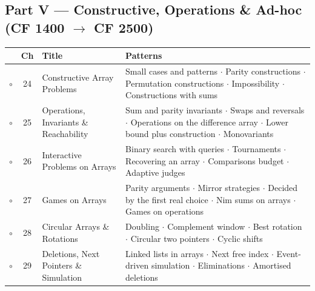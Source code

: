\subsection*{Part V --- Constructive, Operations \& Ad-hoc (CF 1400 $\to$ CF 2500)}
\begin{tabularx}{\linewidth}{@{}c c >{\raggedright\arraybackslash}p{3.6cm} X@{}}
\toprule
& \textbf{Ch} & \textbf{Title} & \textbf{Patterns} \\
\midrule
$\circ$ & 24 & Constructive Array Problems & Small cases and patterns $\cdot$ Parity constructions $\cdot$ Permutation constructions $\cdot$ Impossibility $\cdot$ Constructions with sums \\
$\circ$ & 25 & Operations, Invariants \& Reachability & Sum and parity invariants $\cdot$ Swaps and reversals $\cdot$ Operations on the difference array $\cdot$ Lower bound plus construction $\cdot$ Monovariants \\
$\circ$ & 26 & Interactive Problems on Arrays & Binary search with queries $\cdot$ Tournaments $\cdot$ Recovering an array $\cdot$ Comparisons budget $\cdot$ Adaptive judges \\
$\circ$ & 27 & Games on Arrays & Parity arguments $\cdot$ Mirror strategies $\cdot$ Decided by the first real choice $\cdot$ Nim sums on arrays $\cdot$ Games on operations \\
$\circ$ & 28 & Circular Arrays \& Rotations & Doubling $\cdot$ Complement window $\cdot$ Best rotation $\cdot$ Circular two pointers $\cdot$ Cyclic shifts \\
$\circ$ & 29 & Deletions, Next Pointers \& Simulation & Linked lists in arrays $\cdot$ Next free index $\cdot$ Event-driven simulation $\cdot$ Eliminations $\cdot$ Amortised deletions \\
\bottomrule
\end{tabularx}

